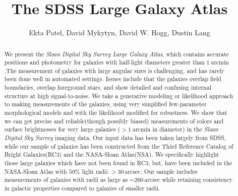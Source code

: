 \documentclass[12pt,preprint,pdftex]{aastex}
\newcounter{address}
\newcommand{\project}[1]{\textsl{#1}}
\newcommand{\units}[1]{\mathrm{#1}}
\renewcommand{\arcmin}{\units{arcmin}}
\renewcommand{\arcsec}{\units{arcsec}}
\begin{document}
\title{
       The SDSS Large Galaxy Atlas
      }
\author{
        Ekta Patel\altaffilmark{\ref{CCPP}},
        David Mykytyn\altaffilmark{\ref{CCPP}},
        David W. Hogg\altaffilmark{\ref{CCPP},\ref{MPIA},\ref{email}},
        Dustin Lang\altaffilmark{\ref{CMU}}
       }
\setcounter{address}{1}

\begin{abstract}
We present the \project{Sloan Digital Sky Survey Large Galaxy Atlas},
which contains accurate positions and photometry for galaxies with
half-light diameters greater than $1~\arcmin$.The measurement of
galaxies with large angular sizes is challenging, and has rarely been
done well in automated settings.  Issues include that the galaxies
overlap field boundaries, overlap foreground stars, and show detailed
and confusing internal structure at high signal-to-noise.  We take a
generative modeling or likelihood approach to making measurements of
the galaxies, using very simplified few-parameter morphological models
and with the likelihood modified for robustness.  We show that we can
get precise and reliable(though possibly biased) measurements of
colors and surface brightnesses for very large galaxies ($>1~\arcmin$
in diameter) in the \project{Sloan Digital Sky Survey} imaging
data. Our input data has been taken largely from SDSS, while our
sample of galaxies has been constructed from the Third Reference
Catalog of Bright Galaxies(RC3) and the NASA-Sloan Atlas(NSA). We specifically
highlight those large galaxies which have not been found in RC3, but,
have been included in the NASA-Sloan Atlas with $50\%$ light radii $>
30\,\arcsec$. Our sample includes measurements of galaxies with radii
as large as $\sim 260\,\arcsec$ while retaining consistency in
galactic properties compared to galaxies of smaller radii.
\end{abstract}
\end{document}

